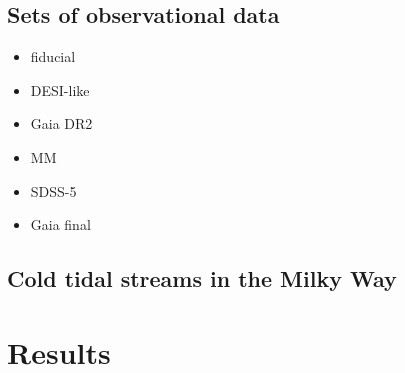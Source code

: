 \documentclass[modern]{aastex61}
\begin{document}
\subsection{Sets of observational data}

\begin{itemize}
 \item fiducial
 \item DESI-like
 \item Gaia DR2
 \item MM
 \item SDSS-5
 \item Gaia final
\end{itemize}

\subsection{Cold tidal streams in the Milky Way}


\section{Results}
\end{document}
